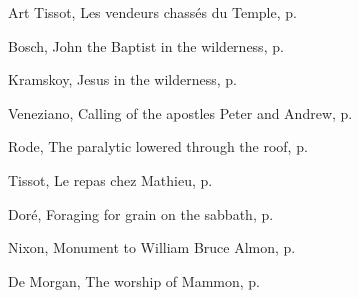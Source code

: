 \documentclass[10pt,twoside]{article} %
\newcommand{\artcredit}[3]{#2, #3, p.~\pageref{fig:#1}}
\begin{document}
\begin{section}{Art}
\artcredit{cleansing-temple}{Tissot}{Les vendeurs chassés du Temple}

\artcredit{john-in-the-wilderness}{Bosch}{John the Baptist in the wilderness}

\artcredit{jesus-in-wilderness}{Kramskoy}{Jesus in the wilderness}

\artcredit{fishers-of-men}{Veneziano}{Calling of the apostles Peter and Andrew}

\artcredit{healing-the-paralytic}{Rode}{The paralytic lowered through the roof}

\artcredit{meal-in-house-of-matthew}{Tissot}{Le repas chez Mathieu}

\artcredit{plucking-corn-on-the-sabbath}{Doré}{Foraging for grain on the sabbath}

\artcredit{good-samaritan}{Nixon}{Monument to William Bruce Almon}

\artcredit{mammon}{De Morgan}{The worship of Mammon}


\end{section}
\end{document}
